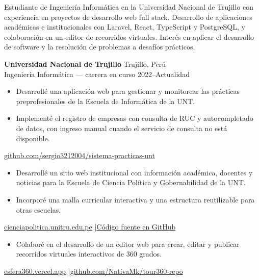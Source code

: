 


Estudiante de Ingeniería Informática en la Universidad Nacional de Trujillo con experiencia en proyectos de desarrollo web full stack. Desarrollo de aplicaciones académicas e institucionales con Laravel, React, TypeScript y PostgreSQL, y colaboración en un editor de recorridos virtuales. Interés en aplicar el desarrollo de software y la resolución de problemas a desafíos prácticos.

\textbf{Universidad Nacional de Trujillo} \hfill Trujillo, Perú\\
Ingeniería Informática --- carrera en curso \hfill 2022--Actualidad

\begin{itemize}
\item Desarrollé una aplicación web para gestionar y monitorear las prácticas preprofesionales de la Escuela de Informática de la UNT.
\item Implementé el registro de empresas con consulta de RUC y autocompletado de datos, con ingreso manual cuando el servicio de consulta no está disponible.
\end{itemize}
{\small \href{https://github.com/sergio3212004/sistema-practicas-unt}{github.com/sergio3212004/sistema-practicas-unt}}\par
\vspace{4pt}
\begin{itemize}
\item Desarrollé un sitio web institucional con información académica, docentes y noticias para la Escuela de Ciencia Política y Gobernabilidad de la UNT.
\item Incorporé una malla curricular interactiva y una estructura reutilizable para otras escuelas.
\end{itemize}
{\small \href{https://cienciapolitica.unitru.edu.pe}{cienciapolitica.unitru.edu.pe} \enspace |\enspace \href{https://github.com/sergio3212004/pagina-ciencia-politica-unt}{Código fuente en GitHub}}\par
\vspace{4pt}
\begin{itemize}
\item Colaboré en el desarrollo de un editor web para crear, editar y publicar recorridos virtuales interactivos de 360 grados.
\end{itemize}
{\small \href{https://esfera360.vercel.app/}{esfera360.vercel.app} \enspace |\enspace \href{https://github.com/NativaMk/tour360-repo}{github.com/NativaMk/tour360-repo}}

